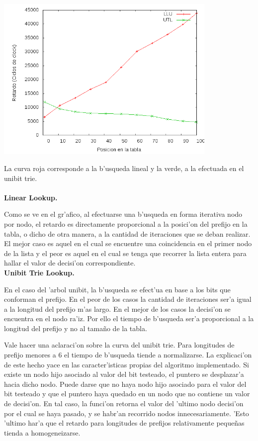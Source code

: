 \documentclass[12pt,spanish]{article}
\begin{document}
\begin{center}
	\includegraphics[width=0.8\textwidth]{graf/llu-utlsof.png}
\end{center}

La curva roja corresponde a la b'usqueda lineal y la verde, a la efectuada en el unibit trie.
\\
\\
\textbf{Linear Lookup.}

Como se ve en el gr'afico, al efectuarse una b'usqueda en forma iterativa nodo por nodo, el retardo es directamente proporcional a la posici'on del prefijo en la tabla, o dicho
de otra manera, a la cantidad de iteraciones que se deban realizar. El mejor caso es aquel en el cual se encuentre una coincidencia en el primer nodo de la lista y
el peor es aquel en el cual se tenga que recorrer la lista entera para hallar el valor de decisi'on correspondiente.
\\


\textbf{Unibit Trie Lookup.}

En el caso del 'arbol unibit, la b'usqueda se efect'ua en base a los bits que conforman el prefijo. En el peor de los casos la cantidad de iteraciones ser'a igual
a la longitud del prefijo m'as largo. En el mejor de los casos la decisi'on se encuentra en el nodo ra'iz. Por ello el tiempo de b'usqueda ser'a proporcional a la 
longitud del prefijo y no al tama\~no de la tabla.

Vale hacer una aclaraci'on sobre la curva del unibit trie. Para longitudes de prefijo menores a 6 el tiempo de b'usqueda tiende a normalizarse. La explicaci'on 
de este hecho yace en las caracter'isticas propias del algoritmo implementado. Si existe un nodo hijo asociado al valor del bit testeado, el puntero se desplazar'a 
hacia dicho nodo. Puede darse que no haya nodo hijo asociado para el valor del bit testeado y que el puntero haya quedado en un nodo que no contiene
un valor de decisi'on. En tal caso, la funci'on retorna el valor del 'ultimo nodo decisi'on por el cual se haya pasado, y se habr'an recorrido nodos innecesariamente.
'Esto 'ultimo har'a que el retardo para longitudes de prefijos relativamente peque\~nas tienda a homogeneizarse.
\end{document}
